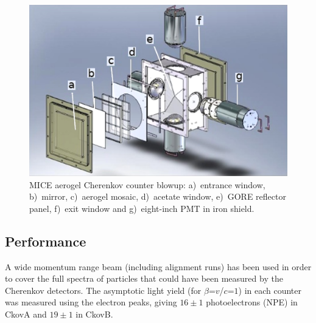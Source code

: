 \begin{figure}[htb!]
  \begin{center}
    \includegraphics[width=0.6\columnwidth]{./03-Ckov/Figures/Ckov_fix.png}
    \caption{MICE aerogel Cherenkov counter blowup: a)~entrance window, b)~mirror, c)~aerogel mosaic, d)~acetate window, e)~GORE reflector panel, f)~exit window and g)~eight-inch PMT in iron shield.}
    \label{fig:ckov1}
  \end{center}
\end{figure}

\subsection{Performance}
\label{SubSect:Ckov_Performance}

A wide momentum range beam (including alignment runs) has been used in order to cover the full spectra of particles that could have been measured by the Cherenkov detectors.
The asymptotic light yield (for $\beta$=$v$/$c$=$1$) in each counter was measured using the electron peaks, giving $16\pm1$ photoelectrons (NPE) in CkovA and $19\pm1$ in CkovB.




